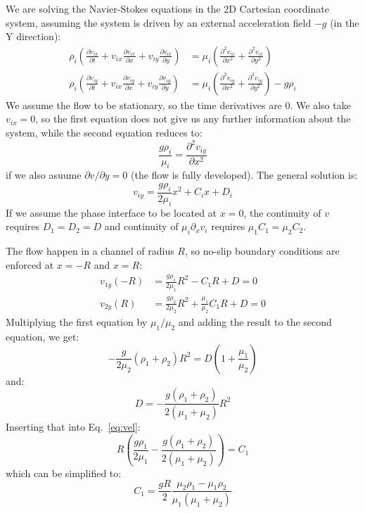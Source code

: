 \documentclass[a4paper]{report}
\begin{document}
We are solving the Navier-Stokes equations in the 2D Cartesian coordinate system, assuming the system is driven by an
external acceleration field $-g$ (in the Y direction):
\begin{align}
	\rho_i \left( \frac{\partial v_{ix}}{\partial t} + v_{ix} \frac{\partial v_{ix}}{\partial x} + v_{iy} \frac{\partial v_{ix}}{\partial y} \right) &= \mu_i
		\left( \frac{\partial^2 v_{ix}}{\partial x ^2 } + \frac{\partial^2 v_{ix}}{\partial y^2} \right) \\
	\rho_i \left( \frac{\partial v_{iy}}{\partial t} + v_{ix} \frac{\partial v_{iy}}{\partial x} + v_{iy} \frac{\partial v_{iy}}{\partial y} \right) &= \mu_i
		\left( \frac{\partial^2 v_{iy}}{\partial x ^2 } + \frac{\partial^2 v_{iy}}{\partial y^2} \right) - g \rho_i
\end{align}
We assume the flow to be stationary, so the time derivatives are 0.  We also take $v_{ix} = 0$, so the first equation
does not give us any further information about the system, while the second equation reduces to:
\begin{equation}
	\frac{g \rho_i}{\mu_i} = \frac{\partial^2 v_{iy}}{\partial x^2}
\end{equation}
if we also asuume $\partial v / \partial y = 0$ (the flow is fully developed).  The general solution is:
\begin{equation}
	v_{iy} = \frac{g \rho_i}{2 \mu_i} x^2 + C_i x + D_i
	\label{eq:gensol}
\end{equation}
If we assume the phase interface to be located at $x = 0$, the continuity of $v$ requires $D_1 = D_2 = D$ and continuity of $\mu_i \partial_x v_i$ requires $\mu_1 C_1 = \mu_2 C_2$.

The flow happen in a channel of radius $R$, so no-slip boundary conditions are enforced at $x = -R$ and $x = R$:
\begin{align}
	v_{1y}(-R) &= \frac{g \rho_1}{2 \mu_1} R^2 - C_1 R + D = 0\\
	v_{2y}(R) &= \frac{g \rho_2}{2 \mu_2} R^2 + \frac{\mu_1}{\mu_2} C_1 R + D = 0
	\label{eq:vel}
\end{align}
Multiplying the first equation by $\mu_1 / \mu_2$ and adding the result to the second equation, we get:
\begin{equation}
	- \frac{g}{2 \mu_2} (\rho_1 + \rho_2) R^2 = D \left( 1 + \frac{\mu_1}{\mu_2} \right)
\end{equation}
and:
\begin{equation}
	D = -\frac{g (\rho_1 + \rho_2)}{ 2 (\mu_1 + \mu_2)} R^2
\end{equation}
Inserting that into Eq.~\ref{eq:vel}:
\begin{equation}
	R \left(\frac{g \rho_1}{2 \mu_1} -\frac{g (\rho_1 + \rho_2)}{ 2 (\mu_1 + \mu_2)} \right) = C_1
\end{equation}
which can be simplified to:
\begin{equation}
	C_1 = \frac{g R}{2} \frac{\mu_2 \rho_1 - \mu_1 \rho_2 }{\mu_1 (\mu_1 + \mu_2)}
\end{equation}
\end{document}
